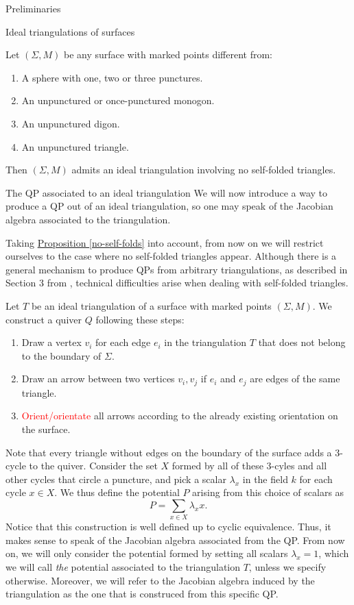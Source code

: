 \begin{chapter}{Preliminaries}
\begin{section}{Ideal triangulations of surfaces}
\begin{prop}\label{no-self-folds} Let $(\Sigma, M)$ be any surface with marked points different from:
\begin{enumerate}
\item A sphere with one, two or three punctures.
\item An unpunctured or once-punctured monogon.
\item An unpunctured digon.
\item An unpunctured triangle.
\end{enumerate}
Then $(\Sigma, M)$ admits an ideal triangulation involving no self-folded triangles. \hfill\qedsymbol
\end{prop}
\end{section}

\begin{section}{The QP associated to an ideal triangulation}\label{qp}
We will now introduce a way to produce a QP out of an ideal triangulation, so one may speak of the Jacobian algebra associated to the triangulation.

Taking \hyperref[no-self-folds]{Proposition \ref*{no-self-folds}} into account, from now on we will restrict ourselves to the case where no self-folded triangles appear. Although there is a general mechanism to produce QPs from arbitrary triangulations, as described in Section 3 from \cite{LF09}, technical difficulties arise when dealing with self-folded triangles.

Let $T$ be an ideal triangulation of a surface with marked points $(\Sigma, M)$. We construct a quiver $Q$ following these steps:
\begin{enumerate}
\item Draw a vertex $v_i$ for each edge $e_i$ in the triangulation $T$ that does not belong to the boundary of $\Sigma$.
\item Draw an arrow between two vertices $v_i, v_j$ if $e_i$ and $e_j$ are edges of the same triangle.
\item \textcolor{red}{Orient/orientate} all arrows according to the already existing orientation on the surface.
\end{enumerate}

Note that every triangle without edges on the boundary of the surface adds a 3-cycle to the quiver. Consider the set $X$ formed by all of these 3-cyles and all other cycles that circle a puncture, and pick a scalar $\lambda_x$ in the field $k$ for each cycle $x\in X$. We thus define the potential $P$ arising from this choice of scalars as
\[P=\sum_{x\in X} \lambda_x x.\]
Notice that this construction is well defined up to cyclic equivalence. Thus, it makes sense to speak of the Jacobian algebra associated from the QP. From now on, we will only consider the potential formed by setting all scalars $\lambda_x=1$, which we will call \emph{the} potential associated to the triangulation $T$, unless we specify otherwise. Moreover, we will refer to the Jacobian algebra induced by the triangulation as the one that is construced from this specific QP.


\end{section}
\end{chapter}
